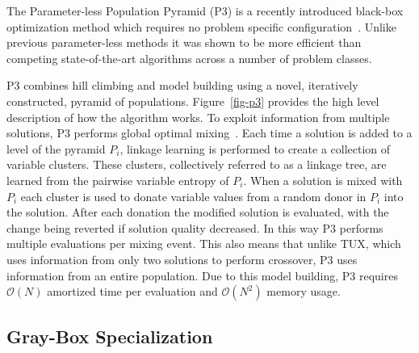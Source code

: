 \documentclass{sig-alternate}
\newcommand{\BigO}[1]{$\mathcal{O}{(#1)}$}
\begin{document}
The Parameter-less Population Pyramid (P3) is a recently introduced
black-box optimization method which requires no problem specific configuration~\cite{goldman:2014:p3}.
Unlike previous parameter-less methods it was shown to be more efficient than
competing state-of-the-art algorithms across a number of problem classes.

P3 combines hill climbing and model building using a novel, iteratively constructed, pyramid
of populations. Figure~\ref{fig-p3} provides the high level description of how the algorithm
works. To exploit information from multiple solutions, P3 performs global optimal mixing~\cite{thierens:2011:gomea}.
Each time a solution is added to a level of the pyramid $P_i$, linkage learning is performed to
create a collection of variable clusters. These clusters, collectively referred to as a linkage tree,
are learned from the pairwise variable entropy of $P_i$. When a solution is mixed with $P_i$
each cluster is used to donate variable values from a random donor in $P_i$ into the solution.
After each donation the modified solution is evaluated,
with the change being reverted if solution quality decreased. In this way P3 performs
multiple evaluations per mixing event. This also means that unlike TUX, which uses information from only two
solutions to perform crossover, P3 uses information from an entire population.
Due to this model building, P3 requires \BigO{N} amortized time per evaluation and \BigO{N^2}
memory usage.

\subsection{Gray-Box Specialization}
\begin{comment}
\begin{figure}
  \begin{algorithmic}[1]
  \Procedure{SubfunctionTree}{}
    \State $clusters \leftarrow [\{0\}, \{1\}, \{2\}, \dots, \{N-1\}]$
    \State $cluster\_number \leftarrow [0 .. N-1]$
    \ForAll{$subfunction \in shuffled(subfunctions)$}
      \State $to\_merge \leftarrow \emptyset$
      \ForAll{$b \in subfunction$}
        \State $to\_merge \leftarrow to\_merge \cup \{cluster\_number[b]\}$
      \EndFor
      \If{$|to\_merge| > 1$}
        \State $new\_cluster \leftarrow \emptyset$
        \ForAll{$i \in to\_merge$}
          \State $new\_cluster \leftarrow new\_cluster \cup clusters[i]$
        \EndFor
        \ForAll{$b \in new\_cluster$}
          \State $cluster\_number[b] \leftarrow |clusters|$
        \EndFor
        \State $clusters \leftarrow clusters + new\_cluster$
      \EndIf
    \EndFor
    \State Remove first $N~clusters$
    \State Remove any cluster containing all variables
  \EndProcedure
\end{algorithmic}
  \caption{Algorithm used to convert a list of subfunctions into linkage tree clusters.}
  \label{fig-sfx-tree}
\end{figure}
\end{comment}
\end{document}
